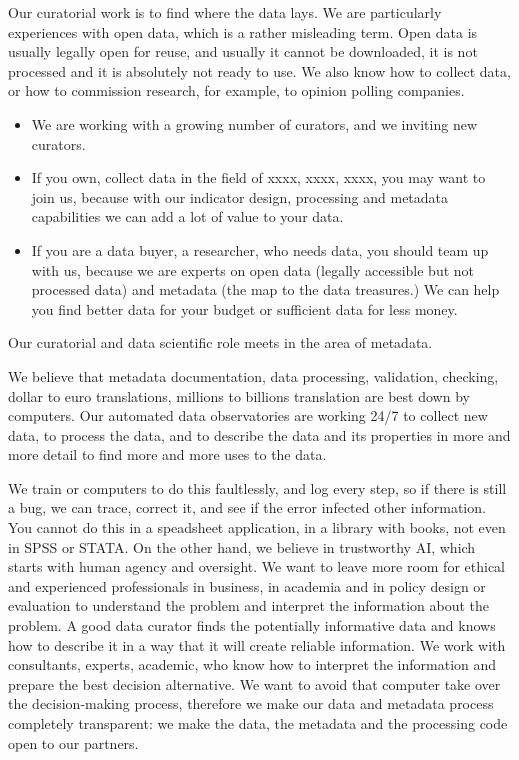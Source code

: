 \documentclass[
  a4paper,
  openany, a4paper, oneside]{book}
\providecommand{\tightlist}{%
  \setlength{\itemsep}{0pt}\setlength{\parskip}{0pt}}
\begin{document}
Our curatorial work is to find where the data lays. We are particularly experiences with open data, which is a rather misleading term. Open data is usually legally open for reuse, and usually it cannot be downloaded, it is not processed and it is absolutely not ready to use. We also know how to collect data, or how to commission research, for example, to opinion polling companies.

\begin{itemize}
\tightlist
\item
  We are working with a growing number of curators, and we inviting new curators.
\item
  If you own, collect data in the field of xxxx, xxxx, xxxx, you may want to join us, because with our indicator design, processing and metadata capabilities we can add a lot of value to your data.
\item
  If you are a data buyer, a researcher, who needs data, you should team up with us, because we are experts on open data (legally accessible but not processed data) and metadata (the map to the data treasures.) We can help you find better data for your budget or sufficient data for less money.
\end{itemize}

Our curatorial and data scientific role meets in the area of metadata.

We believe that metadata documentation, data processing, validation, checking, dollar to euro translations, millions to billions translation are best down by computers. Our automated data observatories are working 24/7 to collect new data, to process the data, and to describe the data and its properties in more and more detail to find more and more uses to the data.

We train or computers to do this faultlessly, and log every step, so if there is still a bug, we can trace, correct it, and see if the error infected other information. You cannot do this in a speadsheet application, in a library with books, not even in SPSS or STATA.
On the other hand, we believe in trustworthy AI, which starts with human agency and oversight. We want to leave more room for ethical and experienced professionals in business, in academia and in policy design or evaluation to understand the problem and interpret the information about the problem. A good data curator finds the potentially informative data and knows how to describe it in a way that it will create reliable information. We work with consultants, experts, academic, who know how to interpret the information and prepare the best decision alternative. We want to avoid that computer take over the decision-making process, therefore we make our data and metadata process completely transparent: we make the data, the metadata and the processing code open to our partners.
\end{document}
